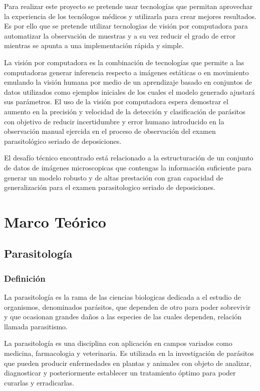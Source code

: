 \documentclass[letter,12pt]{report}
\begin{document}
    Para realizar este proyecto se pretende usar tecnologías que permitan aprovechar la
    experiencia de los tecnólogos médicos y utilizarla para crear mejores resultados.
    Es por ello que se pretende utilizar tecnologias de visión por computadora para
    automatizar la observación de muestras y a su vez reducir el grado de error mientras
    se apunta a una implementación rápida y simple.

    La visión por computadora es la combinación de tecnologías que permite a las
    computadoras generar inferencia respecto a imágenes estáticas o en movimiento
    emulando la visión humana por medio de un aprendizaje basado en conjuntos de datos
    utilizados como ejemplos iniciales de los cuales el modelo generado ajustará sus
    parámetros. %
    El uso de la visión por computadora espera demostrar el aumento en la precisión y
    velocidad de la detección y clasificación de parásitos con objetivo de reducir
    incertidumbre y error humano introducido en la observación manual ejercida en el proceso
    de observación del examen parasitológico seriado de deposiciones. 

    El desafío técnico encontrado está relacionado a la estructuración de un conjunto de
    datos de imágenes microscopicas que contengas la información suficiente para generar
    un modelo robusto y de altas prestación con gran capacidad de generalización para el
    examen parasitologico seriado de deposiciones.


\chapter{Marco Teórico}\label{teorico}

\section{Parasitología}
\subsection{Definición}
La parasitología es la rama de las ciencias biologicas dedicada a el estudio de
organismos, denominados parásitos, que dependen de otro para poder sobrevivir y que
ocasionan grandes daños a las especies de las cuales dependen, relación llamada
parasitismo.

La parasitología es una disciplina con aplicación en campos variados como medicina,
farmacologia y veterinaria. Es utilizada en la investigación de parásitos que pueden
producir enfermedades en plantas y animales con objeto de analizar, diagnosticar y
posteriormente establecer un tratamiento óptimo para poder curarlas y
erradicarlas\cite{Paras}.
\end{document}
